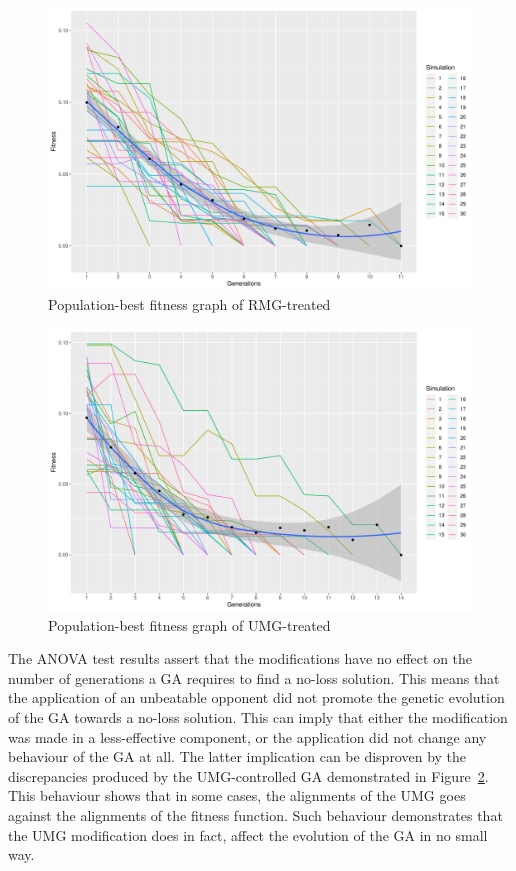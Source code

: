 \documentclass{strrespaper-trad}
\begin{document}
		\begin{figure}[htbp]
			\centering
			\includegraphics[width=\textwidth]{../figures/rmg_ftrack}
			\caption{Population-best fitness graph of RMG-treated}
			\label{fig:fitgraph_rmg}
		\end{figure}
		\begin{figure}[htbp]
			\centering
			\includegraphics[width=\textwidth]{../figures/umg_ftrack}
			\caption{Population-best fitness graph of UMG-treated}
			\label{fig:fitgraph_umg}
		\end{figure}

		The ANOVA test results assert that the modifications have no effect on the number of generations a GA requires to find a no-loss solution.
		This means that the application of an unbeatable opponent did not promote the genetic evolution of the GA towards a no-loss solution.
		This can imply that either the modification was made in a less-effective component, or the application did not change any behaviour of the GA at all.
		The latter implication can be disproven by the discrepancies produced by the UMG-controlled GA demonstrated in Figure~\ref{fig:fitgraph_umg}.
		This behaviour shows that in some cases, the alignments of the UMG goes against the alignments of the fitness function.
		Such behaviour demonstrates that the UMG modification does in fact, affect the evolution of the GA in no small way.
\end{document}
